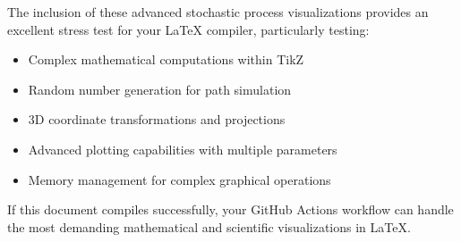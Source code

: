 \documentclass[12pt,a4paper,twoside]{article}
\theoremstyle{definition}
\begin{document}
The inclusion of these advanced stochastic process visualizations provides an excellent stress test for your LaTeX compiler, particularly testing:

\begin{itemize}
\item Complex mathematical computations within TikZ
\item Random number generation for path simulation
\item 3D coordinate transformations and projections
\item Advanced plotting capabilities with multiple parameters
\item Memory management for complex graphical operations
\end{itemize}

If this document compiles successfully, your GitHub Actions workflow can handle the most demanding mathematical and scientific visualizations in LaTeX.
\end{document}
